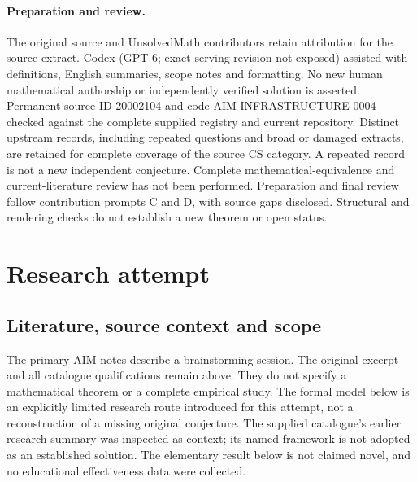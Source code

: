 \documentclass[11pt]{article}
\begin{document}
\paragraph{Preparation and review.}
The original source and UnsolvedMath contributors retain attribution for the source extract. Codex (GPT-6; exact serving revision not exposed) assisted with definitions, English summaries, scope notes and formatting. No new human mathematical authorship or independently verified solution is asserted. Permanent source ID 20002104 and code AIM-INFRASTRUCTURE-0004 checked against the complete supplied registry and current repository. Distinct upstream records, including repeated questions and broad or damaged extracts, are retained for complete coverage of the source CS category. A repeated record is not a new independent conjecture. Complete mathematical-equivalence and current-literature review has not been performed. Preparation and final review follow contribution prompts C and D, with source gaps disclosed. Structural and rendering checks do not establish a new theorem or open status.
\label{end:20002104}

\section{Research attempt}
\subsection{Literature, source context and scope}
The primary AIM notes describe a brainstorming session. The original excerpt and all catalogue qualifications remain above. They do not specify a mathematical theorem or a complete empirical study. The formal model below is an explicitly limited research route introduced for this attempt, not a reconstruction of a missing original conjecture. The supplied catalogue's earlier research summary was inspected as context; its named framework is not adopted as an established solution. The elementary result below is not claimed novel, and no educational effectiveness data were collected.
\end{document}
